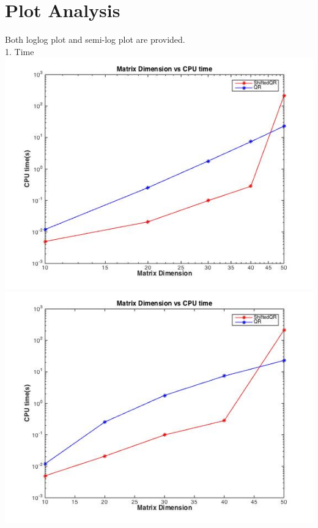 \documentclass[12pt,a4paper]{article}
\begin{document}
\section{Plot Analysis}
Both loglog plot and semi-log plot are provided.\\
1. Time\\
\includegraphics[scale =0.7 ]{./time.jpg}\\
\includegraphics[scale =0.7]{./semitime.jpg}\\
\end{document}
